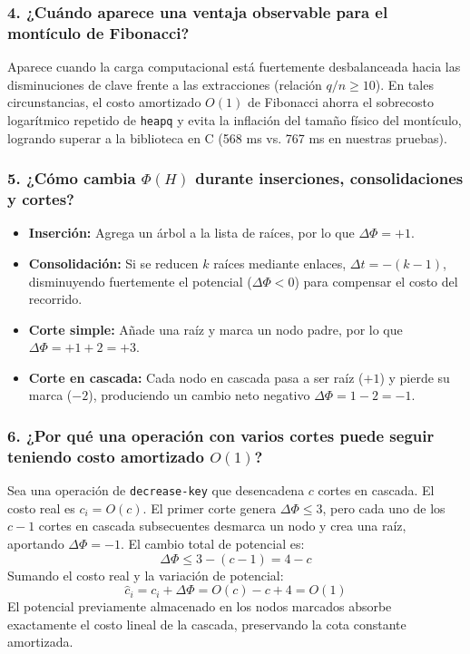 \subsubsection*{4. ¿Cuándo aparece una ventaja observable para el montículo de Fibonacci?}
Aparece cuando la carga computacional está fuertemente desbalanceada hacia las disminuciones de clave frente a las extracciones (relación $q/n \ge 10$). En tales circunstancias, el costo amortizado $O(1)$ de Fibonacci ahorra el sobrecosto logarítmico repetido de \texttt{heapq} y evita la inflación del tamaño físico del montículo, logrando superar a la biblioteca en C (568 ms vs. 767 ms en nuestras pruebas).

\subsubsection*{5. ¿Cómo cambia $\Phi(H)$ durante inserciones, consolidaciones y cortes?}
\begin{itemize}
    \item \textbf{Inserción:} Agrega un árbol a la lista de raíces, por lo que $\Delta \Phi = +1$.
    \item \textbf{Consolidación:} Si se reducen $k$ raíces mediante enlaces, $\Delta t = -(k - 1)$, disminuyendo fuertemente el potencial ($\Delta \Phi < 0$) para compensar el costo del recorrido.
    \item \textbf{Corte simple:} Añade una raíz y marca un nodo padre, por lo que $\Delta \Phi = +1 + 2 = +3$.
    \item \textbf{Corte en cascada:} Cada nodo en cascada pasa a ser raíz ($+1$) y pierde su marca ($-2$), produciendo un cambio neto negativo $\Delta \Phi = 1 - 2 = -1$.
\end{itemize}

\subsubsection*{6. ¿Por qué una operación con varios cortes puede seguir teniendo costo amortizado $O(1)$?}
Sea una operación de \texttt{decrease-key} que desencadena $c$ cortes en cascada. El costo real es $c_i = O(c)$. El primer corte genera $\Delta \Phi \le 3$, pero cada uno de los $c - 1$ cortes en cascada subsecuentes desmarca un nodo y crea una raíz, aportando $\Delta \Phi = -1$. El cambio total de potencial es:
\begin{equation}
    \Delta \Phi \le 3 - (c - 1) = 4 - c
\end{equation}
Sumando el costo real y la variación de potencial:
\begin{equation}
    \hat{c}_i = c_i + \Delta \Phi = O(c) - c + 4 = O(1)
\end{equation}
El potencial previamente almacenado en los nodos marcados absorbe exactamente el costo lineal de la cascada, preservando la cota constante amortizada.

